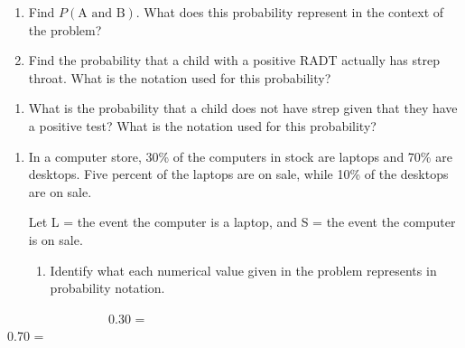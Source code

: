 \documentclass[
]{report}
\providecommand{\tightlist}{%
  \setlength{\itemsep}{0pt}\setlength{\parskip}{0pt}}
\begin{document}
\begin{enumerate}
\def\labelenumi{\alph{enumi}.}
\setcounter{enumi}{2}
\item
  Find \(P(\mbox{A and B})\). What does this probability represent in the context of the problem?
  \vspace{.8in}
\item
  Find the probability that a child with a positive RADT actually has strep throat. What is the notation used for this probability?
\end{enumerate}

\vspace{.8in}

\begin{enumerate}
\def\labelenumi{\alph{enumi}.}
\setcounter{enumi}{4}
\tightlist
\item
  What is the probability that a child does not have strep given that they have a positive test? What is the notation used for this probability?
\end{enumerate}

\newpage

\begin{enumerate}
\def\labelenumi{\arabic{enumi}.}
\setcounter{enumi}{4}
\item
  In a computer store, 30\% of the computers in stock are laptops and 70\% are desktops. Five percent of the laptops are on sale, while 10\% of the desktops are on sale.
  \vspace{1mm}

  Let L = the event the computer is a laptop, and S = the event the computer is on sale.
  \vspace{0.1in}

  \begin{enumerate}
  \def\labelenumii{\alph{enumii}.}
  \tightlist
  \item
    Identify what each numerical value given in the problem represents in probability notation.
    \vspace{.1in}
  \end{enumerate}
\end{enumerate}

~~~~~~~~~~~~~~~~0.30 = \vspace{.1in}\\
\hspace*{0.333em}\hspace*{0.333em}\hspace*{0.333em}\hspace*{0.333em}\hspace*{0.333em}\hspace*{0.333em}\hspace*{0.333em}\hspace*{0.333em}\hspace*{0.333em}\hspace*{0.333em}\hspace*{0.333em}\hspace*{0.333em}\hspace*{0.333em}\hspace*{0.333em}\hspace*{0.333em}\hspace*{0.333em}0.70 =
\end{document}
